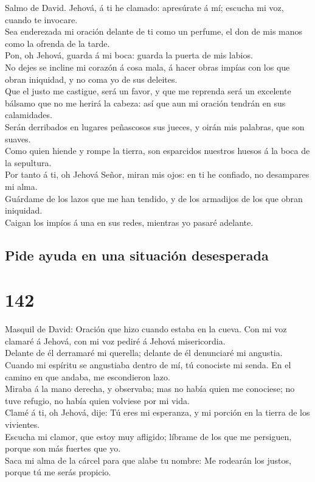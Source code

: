  Salmo de David. Jehová, á ti he clamado: apresúrate á mí;
escucha mi voz, cuando te invocare.\\
 Sea enderezada mi oración delante de ti como un perfume,
el don de mis manos como la ofrenda de la tarde.\\
 Pon, oh Jehová, guarda á mi boca: guarda la puerta de mis
labios.\\
 No dejes se incline mi corazón á cosa mala, á hacer obras
impías con los que obran iniquidad, y no coma yo de sus deleites.\\
 Que el justo me castigue, será un favor, y que me
reprenda será un excelente bálsamo que no me herirá la cabeza: así que
aun mi oración tendrán en sus calamidades.\\
 Serán derribados en lugares peñascosos sus jueces, y
oirán mis palabras, que son suaves.\\
 Como quien hiende y rompe la tierra, son esparcidos
nuestros huesos á la boca de la sepultura.\\
 Por tanto á ti, oh Jehová Señor, miran mis ojos: en ti he
confiado, no desampares mi alma.\\
 Guárdame de los lazos que me han tendido, y de los
armadijos de los que obran iniquidad.\\
 Caigan los impíos á una en sus redes, mientras yo pasaré
adelante.

\hypertarget{pide-ayuda-en-una-situaciuxf3n-desesperada}{%
\subsection{Pide ayuda en una situación
desesperada}\label{pide-ayuda-en-una-situaciuxf3n-desesperada}}

\hypertarget{section-141}{%
\section{142}\label{section-141}}

 Masquil de David: Oración que hizo cuando estaba en la
cueva. Con mi voz clamaré á Jehová, con mi voz pediré á Jehová
misericordia.\\
 Delante de él derramaré mi querella; delante de él
denunciaré mi angustia.\\
 Cuando mi espíritu se angustiaba dentro de mí, tú
conociste mi senda. En el camino en que andaba, me escondieron lazo.\\
 Miraba á la mano derecha, y observaba; mas no había quien
me conociese; no tuve refugio, no había quien volviese por mi vida.\\
 Clamé á ti, oh Jehová, dije: Tú eres mi esperanza, y mi
porción en la tierra de los vivientes.\\
 Escucha mi clamor, que estoy muy afligido; líbrame de los
que me persiguen, porque son más fuertes que yo.\\
 Saca mi alma de la cárcel para que alabe tu nombre: Me
rodearán los justos, porque tú me serás propicio.

